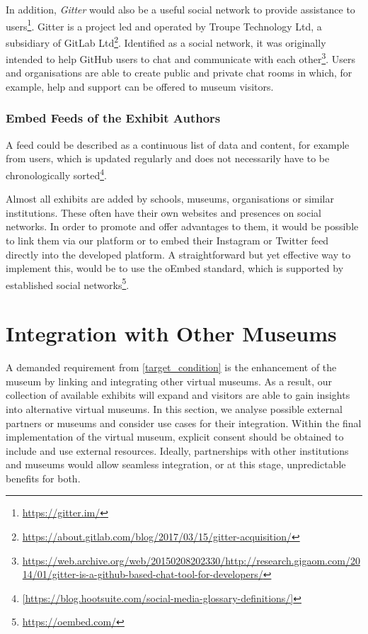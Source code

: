 In addition, \emph{Gitter} would also be a useful social network to provide assistance to users\footnote{\url{https://gitter.im/}}. Gitter is a project led and operated by Troupe Technology Ltd, a subsidiary of GitLab Ltd\footnote{\url{https://about.gitlab.com/blog/2017/03/15/gitter-acquisition/}}. Identified as a social network, it was originally intended to help GitHub users to chat and communicate with each other\footnote{\url{https://web.archive.org/web/20150208202330/http://research.gigaom.com/2014/01/gitter-is-a-github-based-chat-tool-for-developers/}}. Users and organisations are able to create public and private chat rooms in which, for example, help and support can be offered to museum visitors.

\subsubsection{Embed Feeds of the Exhibit Authors} \label{social_feeds}

A feed could be described as a continuous list of data and content, for example from users, which is updated regularly and does not necessarily have to be chronologically sorted\footnote{\ref{https://blog.hootsuite.com/social-media-glossary-definitions/}}. 

Almost all exhibits are added by schools, museums, organisations or similar institutions. These often have their own websites and presences on social networks. In order to promote and offer advantages to them, it would be possible to link them via our platform or to embed their Instagram or Twitter feed directly into the developed platform. A straightforward but yet effective way to implement this, would be to use the oEmbed standard, which is supported by established social networks\footnote{\url{https://oembed.com/}}.

\section{Integration with Other Museums}
\label{cha:Integration with Other Museums}

A demanded requirement from \ref{target_condition} is the enhancement of the museum by linking and integrating other virtual museums. As a result, our collection of available exhibits will expand and visitors are able to gain insights into alternative virtual museums. In this section, we analyse possible external partners or museums and consider use cases for their integration. Within the final implementation of the virtual museum, explicit consent should be obtained to include and use external resources. Ideally, partnerships with other institutions and museums would allow seamless integration, or at this stage, unpredictable benefits for both.

